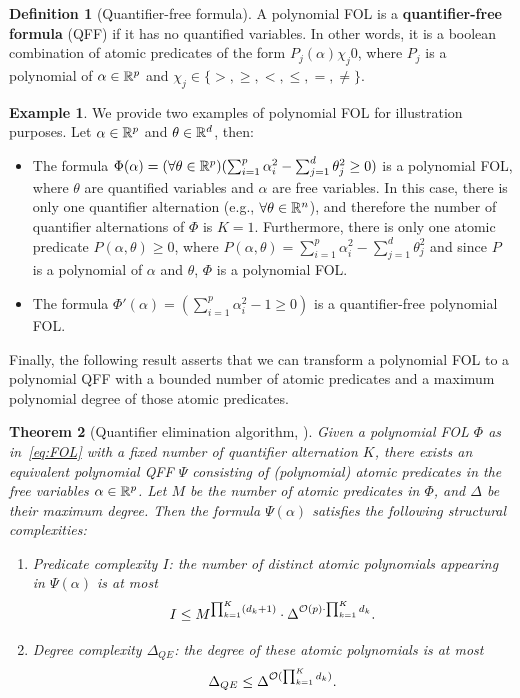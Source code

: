 \documentclass{article}
\theoremstyle{plain}
\newtheorem{theorem}{Theorem}[section]
\theoremstyle{definition}
\newtheorem{definition}[theorem]{Definition}
\newtheorem{example}{Example}
\theoremstyle{remark}
\begin{document}
\begin{definition}[Quantifier-free formula]
    A polynomial FOL is a \textbf{quantifier-free formula} (QFF) if it has no quantified variables. In other words, it is a boolean combination of atomic predicates of the form $P_j(\alpha) \chi_j 0$, where $P_j$ is a polynomial of $\alpha \in \mathbb{R}^p$ and $\chi_j \in \{>, \geq, <, \leq, =, \neq\}$. 
\end{definition}


\begin{example}
We provide two examples of polynomial FOL for illustration purposes. Let $\alpha \in \mathbb{R}^p$ and $\theta \in \mathbb{R}^d$, then:
    \begin{itemize}[leftmargin=*]
        \item The formula $\Phi(\alpha) = (\forall \theta \in \mathbb{R}^p) (\sum_{i = 1}^p \alpha_i^2 - \sum_{j = 1}^d \theta_j^2 \geq 0)$ is a polynomial FOL, where $\theta$ are quantified variables and $\alpha$ are free variables. In this case, there is only one quantifier alternation (e.g., $\forall \theta \in \mathbb{R}^n$), and therefore the number of quantifier alternations of $\Phi$ is $K = 1$. Furthermore, there is only one atomic predicate $P(\alpha, \theta) \geq 0$, where $P(\alpha, \theta) = \sum_{i = 1}^p \alpha_i^2 - \sum_{j = 1}^d \theta_j^2$ and since $P$ is a polynomial of $\alpha$ and $\theta$, $\Phi$ is a polynomial FOL.
        
        \item The formula $\Phi'(\alpha) = (\sum_{i = 1}^p \alpha_i^2 - 1 \geq 0)$ is a quantifier-free polynomial FOL.
    \end{itemize}
\end{example}


Finally, the following result asserts that we can transform a polynomial FOL to a polynomial QFF with a bounded number of atomic predicates and a maximum polynomial degree of those atomic predicates. 
    
 \begin{theorem}[Quantifier elimination algorithm, {\citet[Algorithm~14.8]{basu2006algorithms}}]
    \label{thm:quantifier-elimination}
    Given a polynomial FOL $\Phi$ as in~\eqref{eq:FOL} with a fixed number of quantifier alternation $K$, there exists an equivalent polynomial QFF $\Psi$ consisting of (polynomial) atomic predicates in the free variables $\alpha \in \mathbb{R}^p$. Let $M$ be the number of atomic predicates in $\Phi$, and $\Delta$ be their maximum degree. Then the formula $\Psi(\alpha)$ satisfies the following structural complexities:
    \begin{enumerate}[leftmargin=*]
        \item Predicate complexity $I$: the number of distinct atomic polynomials appearing in $\Psi(\alpha)$ is at most 
        \[
            I \leq M^{\prod_{k = 1}^K (d_k + 1)} \cdot \Delta^{\mathcal{O}(p) \cdot \prod_{k = 1}^K d_k}.
        \]

        \item Degree complexity $\Delta_{QE}$: the degree of these atomic polynomials is at most 
        \[
            \Delta_{QE} \leq \Delta^{\mathcal{O}(\prod_{k = 1}^K d_k)}.
        \]
    \end{enumerate} 
\end{theorem}
\end{document}
